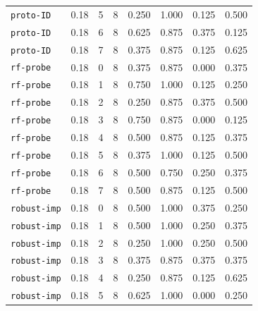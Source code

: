 \documentclass{article}
\begin{document}
\begin{center}
{\begin{tabular}{llllcccc}
\texttt{proto-ID} & 0.18 & 5 & 8 & 0.250 & 1.000 & 0.125 & 0.500 \\
\texttt{proto-ID} & 0.18 & 6 & 8 & 0.625 & 0.875 & 0.375 & 0.125 \\
\texttt{proto-ID} & 0.18 & 7 & 8 & 0.375 & 0.875 & 0.125 & 0.625 \\
\texttt{rf-probe} & 0.18 & 0 & 8 & 0.375 & 0.875 & 0.000 & 0.375 \\
\texttt{rf-probe} & 0.18 & 1 & 8 & 0.750 & 1.000 & 0.125 & 0.250 \\
\texttt{rf-probe} & 0.18 & 2 & 8 & 0.250 & 0.875 & 0.375 & 0.500 \\
\texttt{rf-probe} & 0.18 & 3 & 8 & 0.750 & 0.875 & 0.000 & 0.125 \\
\texttt{rf-probe} & 0.18 & 4 & 8 & 0.500 & 0.875 & 0.125 & 0.375 \\
\texttt{rf-probe} & 0.18 & 5 & 8 & 0.375 & 1.000 & 0.125 & 0.500 \\
\texttt{rf-probe} & 0.18 & 6 & 8 & 0.500 & 0.750 & 0.250 & 0.375 \\
\texttt{rf-probe} & 0.18 & 7 & 8 & 0.500 & 0.875 & 0.125 & 0.500 \\
\texttt{robust-imp} & 0.18 & 0 & 8 & 0.500 & 1.000 & 0.375 & 0.250 \\
\texttt{robust-imp} & 0.18 & 1 & 8 & 0.500 & 1.000 & 0.250 & 0.375 \\
\texttt{robust-imp} & 0.18 & 2 & 8 & 0.250 & 1.000 & 0.250 & 0.500 \\
\texttt{robust-imp} & 0.18 & 3 & 8 & 0.375 & 0.875 & 0.375 & 0.375 \\
\texttt{robust-imp} & 0.18 & 4 & 8 & 0.250 & 0.875 & 0.125 & 0.625 \\
\texttt{robust-imp} & 0.18 & 5 & 8 & 0.625 & 1.000 & 0.000 & 0.250 \\
\bottomrule
\end{tabular}%
}
\end{center}
\end{document}
